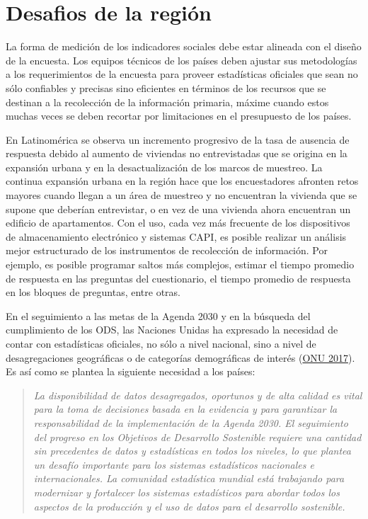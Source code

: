 \documentclass[
  12pt,
  spanish,
]{book}
\begin{document}
\elandscape

\hypertarget{desafios-de-la-regiuxf3n}{%
\section{Desafios de la región}\label{desafios-de-la-regiuxf3n}}

La forma de medición de los indicadores sociales debe estar alineada con el diseño de la encuesta. Los equipos técnicos de los países deben ajustar sus metodologías a los requerimientos de la encuesta para proveer estadísticas oficiales que sean no sólo confiables y precisas sino eficientes en términos de los recursos que se destinan a la recolección de la información primaria, máxime cuando estos muchas veces se deben recortar por limitaciones en el presupuesto de los países.

En Latinomérica se observa un incremento progresivo de la tasa de ausencia de respuesta debido al aumento de viviendas no entrevistadas que se origina en la expansión urbana y en la desactualización de los marcos de muestreo. La continua expansión urbana en la región hace que los encuestadores afronten retos mayores cuando llegan a un área de muestreo y no encuentran la vivienda que se supone que deberían entrevistar, o en vez de una vivienda ahora encuentran un edificio de apartamentos. Con el uso, cada vez más frecuente de los dispositivos de almacenamiento electrónico y sistemas CAPI, es posible realizar un análisis mejor estructurado de los instrumentos de recolección de información. Por ejemplo, es posible programar saltos más complejos, estimar el tiempo promedio de respuesta en las preguntas del cuestionario, el tiempo promedio de respuesta en los bloques de preguntas, entre otras.

En el seguimiento a las metas de la Agenda 2030 y en la búsqueda del cumplimiento de los ODS, las Naciones Unidas ha expresado la necesidad de contar con estadísticas oficiales, no sólo a nivel nacional, sino a nivel de desagregaciones geográficas o de categorías demográficas de interés (\protect\hyperlink{ref-United_Nations_2017}{ONU 2017}). Es así como se plantea la siguiente necesidad a los países:

\begin{quote}
\emph{La disponibilidad de datos desagregados, oportunos y de alta calidad es vital para la toma de decisiones basada en la evidencia y para garantizar la responsabilidad de la implementación de la Agenda 2030. El seguimiento del progreso en los Objetivos de Desarrollo Sostenible requiere una cantidad sin precedentes de datos y estadísticas en todos los niveles, lo que plantea un desafío importante para los sistemas estadísticos nacionales e internacionales. La comunidad estadística mundial está trabajando para modernizar y fortalecer los sistemas estadísticos para abordar todos los aspectos de la producción y el uso de datos para el desarrollo sostenible.}
\end{quote}
\end{document}
